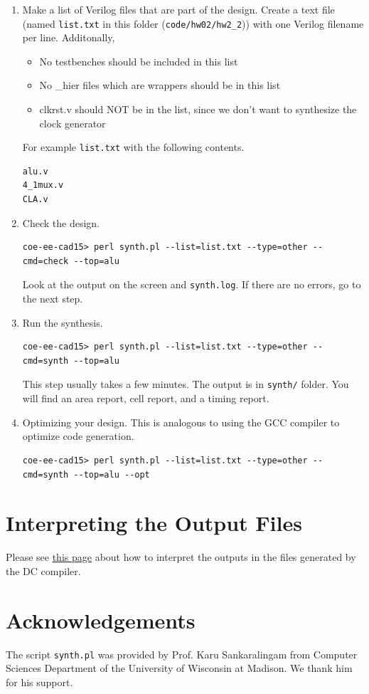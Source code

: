 \documentclass[11pt]{article}
\begin{document}
\begin{enumerate}
\begin{small}
\begin{verbatim}
coe-ee-cad15>  cd code/hw02/hw2_2
\end{verbatim}
\end{small}
\item
Make a list of Verilog files that are part of the design. Create a text file (named \texttt{list.txt} in this folder (\texttt{code/hw02/hw2\_2})) 
with one Verilog filename per line.  Additonally,
\begin{itemize}
\item No testbenches should be included in this list
\item No \_hier files which are wrappers should be in this list
\item clkrst.v should NOT be in the list, since we don't want to synthesize the clock generator
\end{itemize}
For example \texttt{list.txt} with the following contents.
\begin{verbatim}
alu.v
4_1mux.v
CLA.v
\end{verbatim}
\item
Check the design.
\begin{small}
\begin{verbatim}
coe-ee-cad15> perl synth.pl --list=list.txt --type=other --cmd=check --top=alu
\end{verbatim}
\end{small}
Look at the output on the screen and \texttt{synth.log}.  If there are no errors, go to the next step.
\item 
Run the synthesis.
\begin{small}
\begin{verbatim}
coe-ee-cad15> perl synth.pl --list=list.txt --type=other --cmd=synth --top=alu
\end{verbatim}
\end{small}
This step usually takes a few minutes.  The output is in \texttt{synth/} folder.  You will find
an area report, cell report, and a timing report.
\item
Optimizing your design.  This is analogous to using the GCC compiler to optimize code generation.
\begin{small}
\begin{verbatim}
coe-ee-cad15> perl synth.pl --list=list.txt --type=other --cmd=synth --top=alu --opt
\end{verbatim}
\end{small}
\end{enumerate}

\section{Interpreting the Output Files}
Please see \href{https://karu.sites.cs.wisc.edu/courses/cs552/spring2021/wiki/index.php/Synthesis/Synthesis#toc11}{this page} about how
to interpret the outputs in the files generated by the DC compiler.

\section{Acknowledgements}
The script \texttt{synth.pl} was provided by Prof. Karu Sankaralingam from Computer Sciences Department of the University of Wisconsin at Madison.
We thank him for his support.
\end{document}
